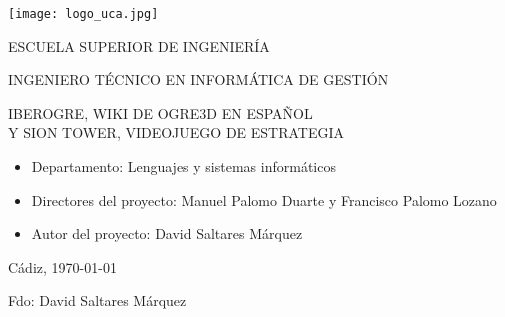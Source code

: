 

\begin{center}

  \texttt{[image: logo\_uca.jpg]} \\

  \vspace{2.0cm}

  \Large{ESCUELA SUPERIOR DE INGENIERÍA} \\

  \vspace{1.0cm}

  \large{INGENIERO TÉCNICO EN INFORMÁTICA DE GESTIÓN} \\

  \vspace{2.0cm}

  \large{IBEROGRE, WIKI DE OGRE3D EN ESPAÑOL\\Y SION TOWER, VIDEOJUEGO DE ESTRATEGIA} \\

  \vspace{1.0cm}

\end{center}

\begin{itemize}
\item \large{Departamento: Lenguajes y sistemas informáticos}
\item \large{Directores del proyecto: Manuel Palomo Duarte y Francisco Palomo Lozano}
\item \large{Autor del proyecto: David Saltares Márquez}
\end{itemize}

\vspace{1.0cm}

\begin{flushright}
  \large{Cádiz, \today} \\

  \vspace{2.5cm}

  \large{Fdo: David Saltares Márquez}
\end{flushright}
